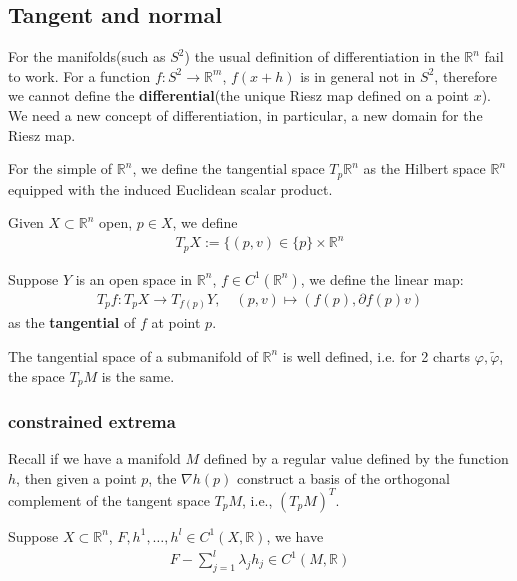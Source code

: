 \begin{definition}
\end{definition}





\subsection{Tangent and normal}
For the manifolds(such as $S^2$) the usual definition of differentiation in the $\mathbb{R}^n$ fail to work. For a function $f: S^2 \rightarrow \mathbb{R}^m$, $f(x + h)$ is in general not in $S^2$, therefore we cannot define the \textbf{differential}(the unique Riesz map defined on a point $x$). We need a new concept of differentiation, in particular, a new domain for the Riesz map.\par
For the simple of $\mathbb{R}^n$, we define the tangential space $T_p \mathbb{R}^n$ as the Hilbert space $\mathbb{R}^n$ equipped with the induced Euclidean scalar product.

\begin{definition}
	Given $X \subset \mathbb{R}^n$ open, $p \in X$, we define
	\begin{align*}
		T_pX:= \{ (p, v) \in \{p\} \times \mathbb{R}^n
	\end{align*}
\end{definition}

\begin{definition}[Tangential of $f \in C^1$]
 Suppose $Y$ is an open space in $\mathbb{R}^n$, $f \in C^1(\mathbb{R}^n)$, we define the linear map:
\begin{align*}
	T_p f: T_p X \rightarrow T_{f(p)} Y,\quad 
	(p, v) \mapsto (f(p), \partial f(p) v)
\end{align*}
as the \textbf{tangential} of $f$ at point $p$.	
\end{definition}

\begin{theorem}
The tangential space of a submanifold of $\mathbb{R}^n$ is well defined, i.e. for 2 charts $\varphi, \tilde{\varphi}$, the space $T_p M$ is the same. 
\end{theorem}

\subsubsection*{constrained extrema}
Recall if we have a manifold $M$ defined by a regular value defined by the function $h$, then given a point $p$, the $\nabla h(p)$ construct a basis of the orthogonal complement of the tangent space $T_p M$, i.e., $(T_p M)^T$. 
\begin{theorem}
	Suppose $X \subset \mathbb{R}^n$, $F, h^1, \dots, h^l \in C^1(X, \mathbb{R})$, we have
	\begin{align*}
		F - \sum_{j = 1}^l \lambda_j h_j \in C^1(M, \mathbb{R})
	\end{align*}
\end{theorem}


